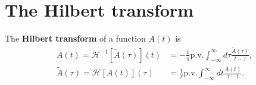 \section{The Hilbert transform}

The \textbf{Hilbert transform} of a function $A\left(t\right)$ is
\begin{subequations}
\begin{align}
    A\left(t\right)
    =
    \mathcal{H}^{-1}\left[\tilde{A}\left(\tau\right)\right]\left(t\right)
    &
    =
    -
    \frac{1}{\pi}\mathrm{p.v.}\int_{-\infty}^{\infty}d\tau\frac{\tilde{A}\left(\tau\right)}{t-\tau}
    ,\\
    \tilde{A}\left(\tau\right)
    =
    \mathcal{H}\left[A\left(t\right)\right]\left(\tau\right)
    &
    =
    \frac{1}{\pi}\mathrm{p.v.}\int_{-\infty}^{\infty}dt\frac{A\left(t\right)}{\tau-t}
    .
\end{align}
\end{subequations}
